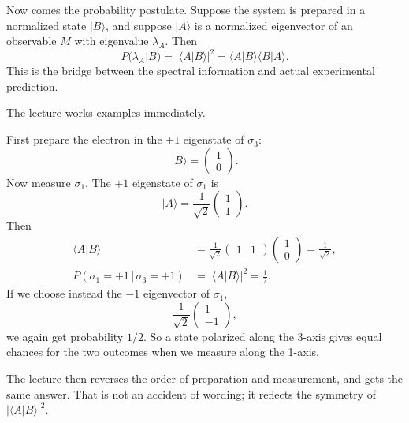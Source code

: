 Now comes the probability postulate. Suppose the system is prepared in a normalized state \(|B\rangle\), and suppose \(|A\rangle\) is a normalized eigenvector of an observable \(M\) with eigenvalue \(\lambda_A\). Then
\begin{equation}
P(\lambda_A|B)=|\langle A|B\rangle|^2=\langle A|B\rangle\langle B|A\rangle.
\end{equation}
This is the bridge between the spectral information and actual experimental prediction.

The lecture works examples immediately.

First prepare the electron in the \(+1\) eigenstate of \(\sigma_3\):
\begin{equation}
|B\rangle=
\begin{pmatrix}
1\\
0
\end{pmatrix}.
\end{equation}
Now measure \(\sigma_1\). The \(+1\) eigenstate of \(\sigma_1\) is
\begin{equation}
|A\rangle=
\frac{1}{\sqrt{2}}
\begin{pmatrix}
1\\
1
\end{pmatrix}.
\end{equation}
Then
\begin{align}
\langle A|B\rangle
&=
\frac{1}{\sqrt{2}}
\begin{pmatrix}
1 & 1
\end{pmatrix}
\begin{pmatrix}
1\\
0
\end{pmatrix}
=
\frac{1}{\sqrt{2}},\\
P(\sigma_1=+1\,|\,\sigma_3=+1)
&=
\left|\langle A|B\rangle\right|^2
=
\frac{1}{2}.
\end{align}
If we choose instead the \(-1\) eigenvector of \(\sigma_1\),
\begin{equation}
\frac{1}{\sqrt{2}}
\begin{pmatrix}
1\\
-1
\end{pmatrix},
\end{equation}
we again get probability \(1/2\). So a state polarized along the 3-axis gives equal chances for the two outcomes when we measure along the 1-axis.

The lecture then reverses the order of preparation and measurement, and gets the same answer. That is not an accident of wording; it reflects the symmetry of \(|\langle A|B\rangle|^2\).

